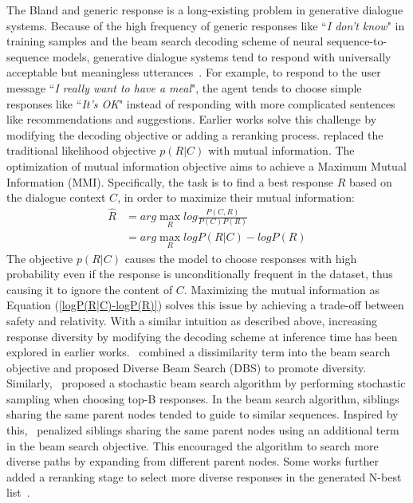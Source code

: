 \label{Response Diversity}
The Bland and generic response is a long-existing problem in generative dialogue systems. Because of the high frequency of generic responses like ``\textit{I don't know}" in training samples and the beam search decoding scheme of neural sequence-to-sequence models, generative dialogue systems tend to respond with universally acceptable but meaningless utterances~. For example, to respond to the user message ``\textit{I really want to have a meal}", the agent tends to choose simple responses like ``\textit{It's OK}" instead of responding with more complicated sentences like recommendations and suggestions. 
Earlier works solve this challenge by modifying the decoding objective or adding a reranking process.  replaced the traditional likelihood objective $p(R|C)$ with mutual information. The optimization of mutual information objective aims to achieve a Maximum Mutual Information (MMI). Specifically, the task is to find a best response $R$ based on the dialogue context $C$, in order to maximize their mutual information: 
\begin{equation}
\begin{split}
\hat{R} &= arg\max_{R}{log\frac{P(C,R)}{P(C)P(R)}} \\&= arg\max_{R}{logP(R|C)-logP(R)}
\end{split}
\label{logP(R|C)-logP(R)}
\end{equation} 
The objective $p(R|C)$ causes the model to choose responses with high probability even if the response is unconditionally frequent in the dataset, thus causing it to ignore the content of $C$. Maximizing the mutual information as Equation (\ref{logP(R|C)-logP(R)}) solves this issue by achieving a trade-off between safety and relativity. 
With a similar intuition as described above, increasing response diversity by modifying the decoding scheme at inference time has been explored in earlier works.~ combined a dissimilarity term into the beam search objective and proposed Diverse Beam Search (DBS) to promote diversity. Similarly,~ proposed a stochastic beam search algorithm by performing stochastic sampling when choosing top-B responses. In the beam search algorithm, siblings sharing the same parent nodes tended to guide to similar sequences. Inspired by this,~ penalized siblings sharing the same parent nodes using an additional term in the beam search objective. This encouraged the algorithm to search more diverse paths by expanding from different parent nodes. Some works further added a reranking stage to select more diverse responses in the generated N-best list~. 
